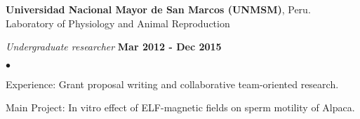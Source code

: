 \documentclass[margin,line]{res}
\newenvironment{list1}{
  \begin{list}{\ding{113}}{%
      \setlength{\itemsep}{0in}
      \setlength{\parsep}{0in} \setlength{\parskip}{0in}
      \setlength{\topsep}{0in} \setlength{\partopsep}{0in}
      \setlength{\leftmargin}{0.17in}}}{\end{list}}
\newenvironment{list2}{
  \begin{list}{$\bullet$}{%
      \setlength{\itemsep}{0in}
      \setlength{\parsep}{0in} \setlength{\parskip}{0in}
      \setlength{\topsep}{0in} \setlength{\partopsep}{0in}
      \setlength{\leftmargin}{0.2in}}}{\end{list}}
\begin{document}
\begin{resume}
{\bf Universidad Nacional Mayor de San Marcos (UNMSM)}, Peru.\\
Laboratory of Physiology and Animal Reproduction\\
\vspace*{-.1in}
\begin{list1}
	\item[] {\em Undergraduate researcher} \hfill {\bf Mar 2012 - Dec 2015}\\
	\vspace*{-.1in}
	\begin{list2} %
		\item Experience: Grant proposal writing and collaborative team-oriented research. %
		\item Main Project: In vitro effect of ELF-magnetic fields on sperm motility of Alpaca.\\ %
	\end{list2}
\end{list1}


\end{resume}
\end{document}

